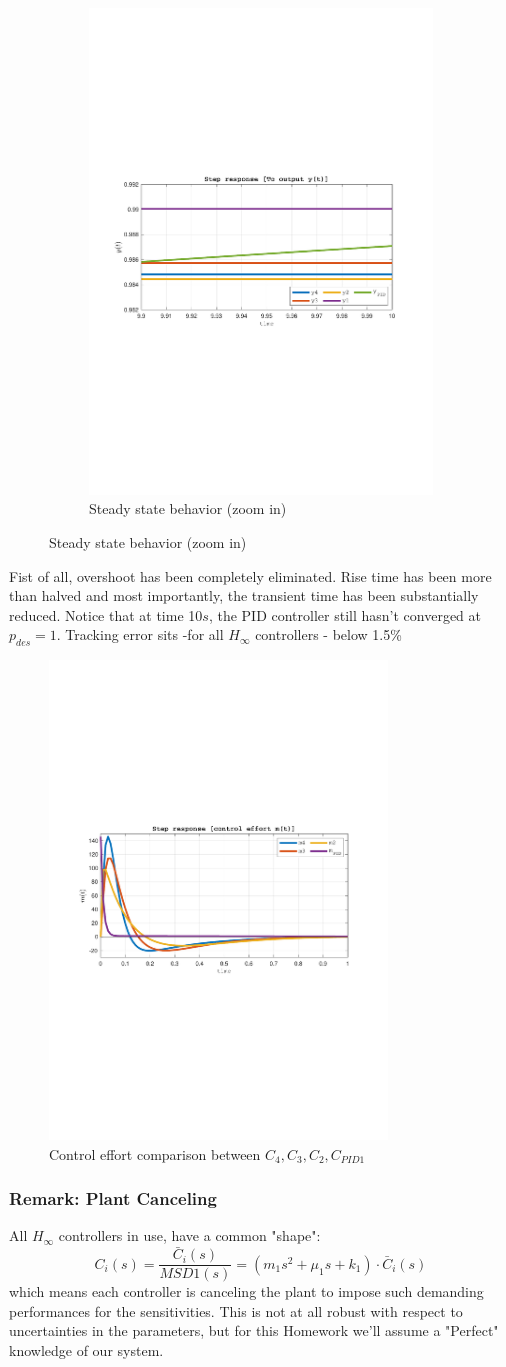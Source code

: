 \documentclass[a4paper, 12pt]{article}
\def\FigureFive{\centering\includegraphics[width=0.8\textwidth]{Figures/fig05.pdf}}
\begin{document}
\begin{figure}[h!]
\begin{subfigure}[t]{0.5\textwidth}
           \includegraphics[width=\textwidth]
           {Figures/fig04c.pdf}
           \caption{Steady state behavior (zoom in)}
           \label{fig:fig04c}
       \end{subfigure}
    \label{fig:fig04}
\end{figure}
Fist of all, overshoot has been completely eliminated. Rise time has been more than halved and most importantly, the transient time has been substantially reduced. Notice that at time 10$s$, the PID controller still hasn't converged at $p_{des} = 1$. Tracking error sits -for all $H_\infty$ controllers - below 1.5\%
\begin{figure}[t]
\FigureFive
\caption{Control effort comparison between $C_4, C_3, C_2, C_{PID1}$}
\label{fig:fig05} 
\end{figure}

\subsubsection*{Remark: Plant Canceling}
All $H_\infty$ controllers in use, have a common "shape":
\begin{equation}
    C_i(s) = \frac{\bar C_i(s)}{MSD1(s)}  = 
    (m_1 s^2 + \mu_1 s + k_1)\cdot \bar C_i(s)
\end{equation}
which means each controller is canceling the plant to impose such demanding performances for the sensitivities. This is not at all robust with respect to uncertainties in the parameters, but for this Homework we'll assume a "Perfect" knowledge of our system.
\end{document}
